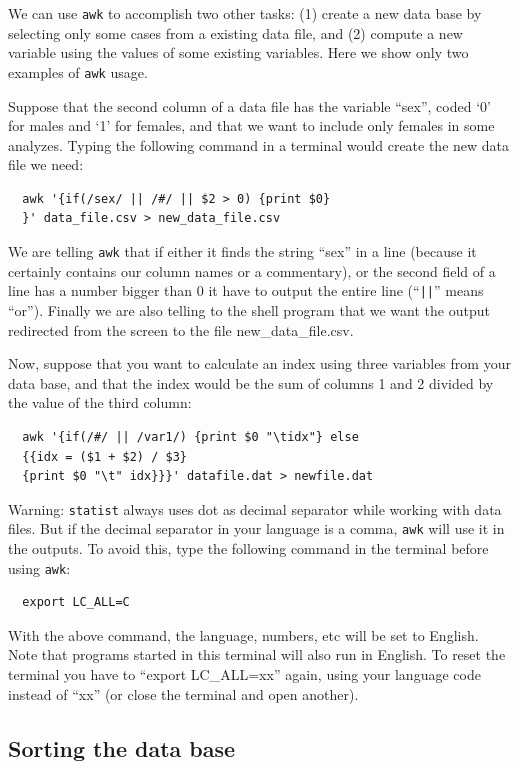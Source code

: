 \documentclass[12pt,english]{article}
\newcommand{\st}{{\tt sta\-tist} }
\begin{document}
We can use {\tt awk} to accomplish two other tasks: (1)
create a new data base by selecting only some cases from a
existing data file, and (2) compute a new variable using the
values of some existing variables. Here we show only two
examples of {\tt awk} usage.

Suppose that the second column of a data file has the
variable ``sex'', coded `0' for males and `1' for females,
and that we want to include only females in some analyzes.
Typing the following command in a terminal would create the
new data file we need:

\begin{verbatim}
  awk '{if(/sex/ || /#/ || $2 > 0) {print $0}
  }' data_file.csv > new_data_file.csv
\end{verbatim}

We are telling {\tt awk} that if either it finds the string
``sex'' in a line (because it certainly contains our column
names or a commentary), or the second field of a line has a
number bigger than $0$ it have to output the entire line
(``{\tt ||}'' means ``or''). Finally we are also telling to the
shell program that we want the output redirected from the
screen to the file new\_data\_file.csv.

Now, suppose that you want to calculate an index using three
variables from your data base, and that the index would be
the sum of columns 1 and 2 divided by the value of the third
column:

\begin{verbatim}
  awk '{if(/#/ || /var1/) {print $0 "\tidx"} else
  {{idx = ($1 + $2) / $3} 
  {print $0 "\t" idx}}}' datafile.dat > newfile.dat
\end{verbatim}

Warning: \st always uses dot as decimal separator while
working with data files. But if the decimal separator in
your language is a comma, {\tt awk} will use it in the
outputs. To avoid this, type the following command in the
terminal before using {\tt awk}:

\begin{verbatim}
  export LC_ALL=C
\end{verbatim}

With the above command, the language, numbers, etc will be
set to English.  Note that programs started in this terminal
will also run in English. To reset the terminal you have to
``export LC\_ALL=xx'' again, using your language code
instead of ``xx'' (or close the terminal and open another).

\subsection{Sorting the data base}
\end{document}
